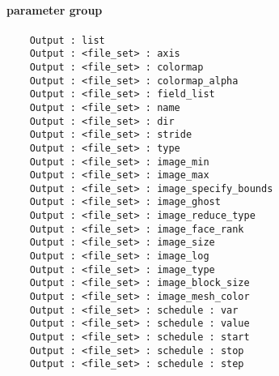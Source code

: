 \NEWSEC

\subsection{\ssParamIo}

\begin{frame}[fragile,label=ss-param-io] 
\secframetitle{\ssParamIo}
\framesubtitle{ parameter group}

\begin{verbatim}
    Output : list
    Output : <file_set> : axis
    Output : <file_set> : colormap
    Output : <file_set> : colormap_alpha
    Output : <file_set> : field_list
    Output : <file_set> : name
    Output : <file_set> : dir
    Output : <file_set> : stride
    Output : <file_set> : type
    Output : <file_set> : image_min
    Output : <file_set> : image_max
    Output : <file_set> : image_specify_bounds
    Output : <file_set> : image_ghost
    Output : <file_set> : image_reduce_type
    Output : <file_set> : image_face_rank
    Output : <file_set> : image_size
    Output : <file_set> : image_log
    Output : <file_set> : image_type
    Output : <file_set> : image_block_size
    Output : <file_set> : image_mesh_color
    Output : <file_set> : schedule : var
    Output : <file_set> : schedule : value
    Output : <file_set> : schedule : start
    Output : <file_set> : schedule : stop
    Output : <file_set> : schedule : step
\end{verbatim}

\end{frame}


